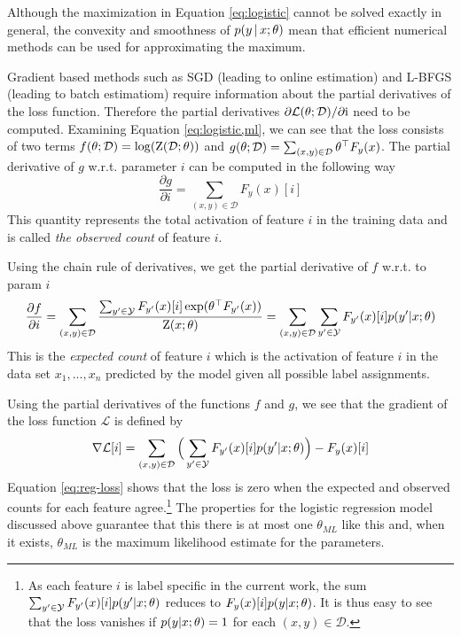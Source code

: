 Although the maximization in Equation \ref{eq:logistic} cannot be
solved exactly in general, the convexity and smoothness of
$p(y\mbox{$ \, | \, $} x\mbox{$ ; \, $} \theta)$ mean that efficient numerical methods can
be used for approximating the maximum.

Gradient based methods such as SGD (leading to online estimation) and
L-BFGS (leading to batch estimatiom) require information about the
partial derivatives of the loss function. Therefore the partial
derivatives $\partial\mathcal{L}(\theta\mbox{$ ; \, $}
\mathcal{D})/\partial\mbox{${\rm i}$}$ need to be computed. Examining Equation
\ref{eq:logistic,ml}, we can see that the loss consists of two terms
$f(\theta\mbox{$ ; \, $} \mathcal{D}) = \log(\mbox{${\rm Z}$}(\mathcal{D}\mbox{$ ; \, $} \theta))$
and $g(\theta\mbox{$ ; \, $}\mathcal{D}) = \sum_{(x,y) \in
  \mathcal{D}}\theta^\top F_y(x)$. The partial derivative of $g$
w.r.t. parameter $i$ can be computed in the following way
$$\frac{\partial g}{\partial i} = \sum_{(x,y) \in \mathcal{D}} F_y(x)[i]$$
This quantity represents the total activation of feature $i$ in the training data and is called {\it the observed count} of feature $i$. 

Using the chain rule of derivatives, we get the partial derivative of $f$ w.r.t. to param $i$
$$\frac{\partial f}{\partial i} = \sum_{(x,y) \in \mathcal{D}} \frac{\sum_{y' \in \mathcal{Y}}F_{y'}(x)[i] \exp(\theta^\top F_{y'}(x))}{\mbox{${\rm Z}$}(x\mbox{$ ; \, $}\theta)} = \sum_{(x,y) \in \mathcal{D}} \sum_{y' \in \mathcal{Y}}F_{y'}(x)[i] p(y'|x\mbox{$ ; \, $}\theta)$$
This is the {\it expected count} of feature $i$ which is the
activation of feature $i$ in the data set $x_1, ...,x_n$ predicted by
the model given all possible label assignments.

Using the partial derivatives of the functions $f$ and $g$, we see that the gradient of the loss function $\mathcal{L}$ is defined by
\begin{equation}\nabla \mathcal{L}[i] = \sum_{(x,y) \in \mathcal{D}} \Big( \sum_{y' \in \mathcal{Y}}F_{y'}(x)[i] p(y'|x\mbox{$ ; \, $}\theta) \Big) - F_y(x)[i] \label{eq:reg-loss}\end{equation}
Equation \ref{eq:reg-loss} shows that the loss is zero when the
expected and observed counts for each feature agree.\footnote{As each feature $i$ is label specific in the current work, the sum $\sum_{y' \in \mathcal{Y}}F_{y'}(x)[i] p(y'|x\mbox{$ ; \, $}\theta)$ reduces to $F_y(x)[i] p(y|x\mbox{$ ; \, $}\theta)$. It is thus easy to see that the loss vanishes if $p(y|x\mbox{$ ; \, $}\theta) = 1$ for each $(x,y)\in\mathcal{D}$.} The
properties for the logistic regression model discussed above guarantee
that this there is at most one $\theta_{ML}$ like this and, when it
exists, $\theta_{ML}$ is the maximum likelihood estimate for the
parameters.

